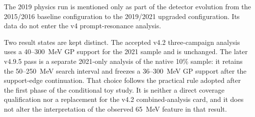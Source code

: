 The 2019 physics run is mentioned only as part of the detector evolution from the
2015/2016 baseline configuration to the 2019/2021 upgraded configuration. Its data do
not enter the v4 prompt-resonance analysis.

Two result states are kept distinct. The accepted v4.2 three-campaign analysis uses a
40--300~MeV GP support for the 2021 sample and is unchanged. The later v4.9.5 pass is a
separate 2021-only analysis of the native 10\% sample: it retains the 50--250~MeV search
interval and freezes a 36--300~MeV GP support after the support-edge continuation. That
choice follows the practical rule adopted after the first phase of the conditional toy
study. It is neither a direct coverage qualification nor a replacement for the v4.2
combined-analysis card, and it does not alter the interpretation of the observed
65~MeV feature in that result.
